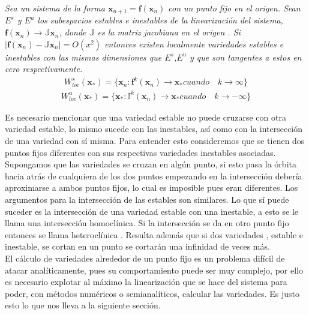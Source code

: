 \begin{thm}
\textit{Sea un sistema de la forma $\pmb x_{n+1}=\mathbf{f}(\pmb x_{n})$ con un punto fijo en el origen. Sean $E^{s}$ y $E^{u}$ los subespacios estables e inestables de la linearización del sistema,$\mathbf{f}(\pmb x_{n})\rightarrow\mathbb{J}\pmb x_{n}$,  donde $\mathbb{J}$ es la matriz jacobiana en el origen . Si $\mid \mathbf{f}(\pmb x_{n})-\mathbb{J}\pmb x_{n}\mid =O(x^{2})$ entonces existen localmente variedades estables e inestables con las mismas dimensiones que $E^{s}$,$E^{u}$ y que son tangentes a estos en cero respectivamente.}
\begin{eqnarray*}
W^{s}_{loc}(\pmb x_{*})= \lbrace \pmb x_{n} : \mathbf{f}^{k}(\pmb x_{n})\rightarrow \pmb x_{*} cuando\quad k \rightarrow \infty \rbrace
\end{eqnarray*}
\begin{eqnarray*}
W^{u}_{loc}(\pmb x_{*}) = \lbrace \pmb x_{*} : \mathbb{f}^{k}(\pmb x_{n})\rightarrow \pmb x_{*} cuando\quad k \rightarrow -\infty \rbrace
\end{eqnarray*}
\end{thm}

Es necesario mencionar que una variedad estable no puede cruzarse con otra variedad estable, lo mismo sucede con las inestables, así como con la intersección de una variedad con sí misma. Para entender esto consideremos que se tienen dos puntos fijos diferentes con sus respectivas variedades inestables asociadas. Supongamos que las variedades se cruzan en algún punto, si esto pasa la órbita hacia atrás de cualquiera de los dos puntos empezando en la intersección debería aproximarse a ambos puntos fijos, lo cual es imposible pues eran diferentes. Los argumentos para la intersección de las estables son similares. Lo que sí puede suceder es la intersección de una variedad estable con una inestable, a esto se le llama una intersección homoclínica. Si la intersección se da en otro punto fijo entonces se llama heteroclínica \cite{Ott}. Resulta además que si dos variedades , estable e inestable, se cortan en un punto se cortarán una infinidad de veces más. \\


El cálculo de variedades alrededor de un punto fijo es un problema difícil de atacar analíticamente, pues su comportamiento puede ser muy complejo, por ello es necesario explotar al máximo la linearización que se hace del sistema para poder, con métodos numéricos o semianalíticos, calcular las variedades. Es justo esto lo que nos lleva a la siguiente sección.




